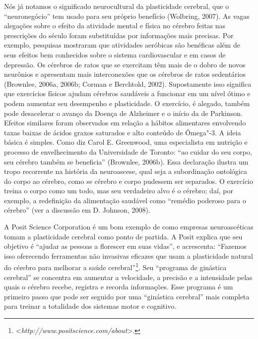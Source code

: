 Nós já notamos o significado neurocultural da plasticidade cerebral, que
o ``neuronegócio'' tem usado para seu próprio benefício (Wolbring,
2007). As vagas alegações sobre o efeito da atividade mental e física no
cérebro feitas nas prescrições do século  foram substituídas por
informações mais precisas. Por exemplo, pesquisas mostraram que
atividades aeróbicas são benéficas além de seus efeitos bem conhecidos
sobre o sistema cardiovascular e em casos de depressão. Os cérebros de
ratos que se exercitam têm mais de o dobro de novos neurônios e
apresentam mais interconexões que os cérebros de ratos sedentários
(Brownlee, 2006a, 2006b; Corman e Berchtold, 2002). Supostamente isso
significa que exercícios físicos ajudam cérebros saudáveis a funcionar
em um nível ótimo e podem aumentar seu desempenho e plasticidade. O
exercício, é alegado, também pode desacelerar o avanço da Doença de
Alzheimer e o início da de Parkinson. Efeitos similares foram observados
em relação a hábitos alimentares envolvendo taxas baixas de ácidos
graxos saturados e alto conteúdo de Ômega"-3. A ideia básica é simples.
Como diz Carol E. Greenwood, uma especialista em nutrição e processo de
envelhecimento da Universidade de Toronto: ``ao cuidar do seu corpo, seu
cérebro também se beneficia'' (Brownlee, 2006b). Essa declaração ilustra
um tropo recorrente na história da neuroascese, qual seja a subordinação
ontológica do corpo ao cérebro, como se cérebro e corpo pudessem ser
separados. O exercício treina o corpo como um todo, mas seu verdadeiro
alvo é o cérebro; daí, por exemplo, a redefinição da alimentação
saudável como ``remédio poderoso para o cérebro'' (ver a discussão em D.
Johnson, 2008).

A Posit Science Corporation é um bom exemplo de como empresas
neuroascéticas tomam a plasticidade cerebral como ponto de partida. A
Posit explica que seu objetivo é ``ajudar as pessoas a florescer em suas
vidas'', e acrescenta: ``Fazemos isso oferecendo ferramentas não
invasivas eficazes que usam a plasticidade natural do cérebro para
melhorar a saúde cerebral''\footnote[13]{\textless{}\emph{http://www.positscience.com/about}\textgreater{}.}. Seu ``programa de
ginástica cerebral'' se concentra em aumentar a velocidade, a precisão e
a intensidade pelas quais o cérebro recebe, registra e recorda
informações. Esse programa é um primeiro passo que pode ser seguido por
uma ``ginástica cerebral'' mais completa para treinar a totalidade dos
sistemas motor e cognitivo.

